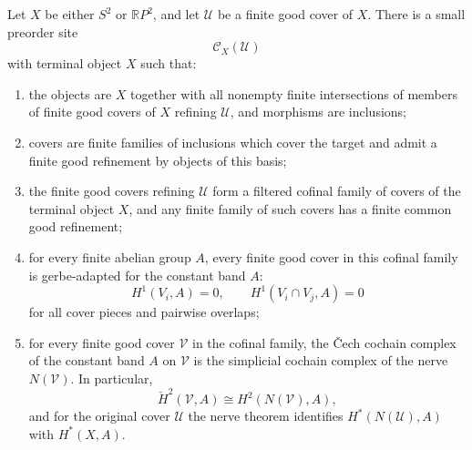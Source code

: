 \begin{proposition}\label{prop:good-cover-semantic-slice}
Let $X$ be either $S^2$ or $\mathbb{R}P^2$, and let $\mathcal U$ be a finite
good cover of $X$. There is a small preorder site
\[
\mathcal C_X(\mathcal U)
\]
with terminal object $X$ such that:
\begin{enumerate}[label=(\roman*),nosep]
\item the objects are $X$ together with all nonempty finite intersections of
members of finite good covers of $X$ refining $\mathcal U$, and morphisms are
inclusions;
\item covers are finite families of inclusions which cover the target and
admit a finite good refinement by objects of this basis;
\item the finite good covers refining $\mathcal U$ form a filtered cofinal
family of covers of the terminal object $X$, and any finite family of such
covers has a finite common good refinement;
\item for every finite abelian group $A$, every finite good cover in this
cofinal family is gerbe-adapted for the constant band $A$:
\[
H^1(V_i,A)=0,
\qquad
H^1(V_i\cap V_j,A)=0
\]
for all cover pieces and pairwise overlaps;
\item for every finite good cover $\mathcal V$ in the cofinal family, the
\v{C}ech cochain complex of the constant band $A$ on $\mathcal V$ is the
simplicial cochain complex of the nerve $N(\mathcal V)$. In particular,
\[
\check H^2(\mathcal V,A)\cong H^2(N(\mathcal V),A),
\]
and for the original cover $\mathcal U$ the nerve theorem identifies
$H^*(N(\mathcal U),A)$ with $H^*(X,A)$.
\end{enumerate}
\end{proposition}

